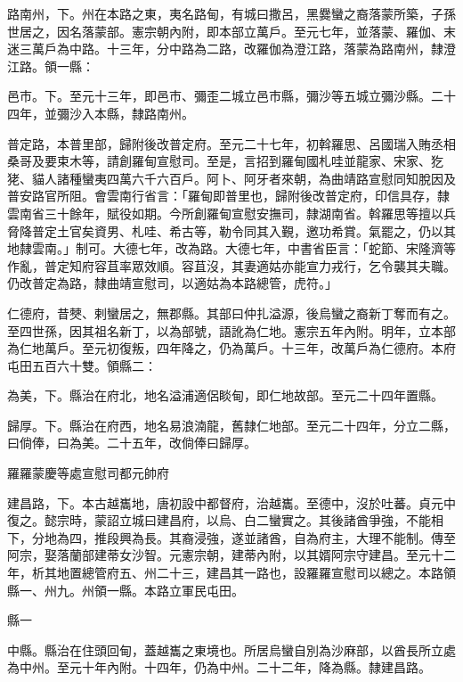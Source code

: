 \begin{pinyinscope}
 路南州，下。州在本路之東，夷名路甸，有城曰撒呂，黑爨蠻之裔落蒙所築，子孫世居之，因名落蒙部。憲宗朝內附，即本部立萬戶。至元七年，並落蒙、羅伽、末迷三萬戶為中路。十三年，分中路為二路，改羅伽為澄江路，落蒙為路南州，隸澄江路。領一縣：



 邑市。下。至元十三年，即邑市、彌歪二城立邑市縣，彌沙等五城立彌沙縣。二十四年，並彌沙入本縣，隸路南州。



 普定路，本普里部，歸附後改普定府。至元二十七年，初斡羅思、呂國瑞入賄丞相桑哥及要束木等，請創羅甸宣慰司。至是，言招到羅甸國札哇並龍家、宋家、犵狫、貓人諸種蠻夷四萬六千六百戶。阿卜、阿牙者來朝，為曲靖路宣慰同知脫因及普安路官所阻。會雲南行省言：「羅甸即普里也，歸附後改普定府，印信具存，隸雲南省三十餘年，賦役如期。今所創羅甸宣慰安撫司，隸湖南省。斡羅思等擅以兵脅降普定土官矣資男、札哇、希古等，勒令同其入覲，邀功希賞。氣罷之，仍以其地隸雲南。」制可。大德七年，改為路。大德七年，中書省臣言：「蛇節、宋隆濟等作亂，普定知府容苴率眾效順。容苴沒，其妻適姑亦能宣力戎行，乞令襲其夫職。仍改普定為路，隸曲靖宣慰司，以適姑為本路總管，虎符。」



 仁德府，昔僰、剌蠻居之，無郡縣。其部曰仲扎溢源，後烏蠻之裔新丁奪而有之。至四世孫，因其祖名新丁，以為部號，語訛為仁地。憲宗五年內附。明年，立本部為仁地萬戶。至元初復叛，四年降之，仍為萬戶。十三年，改萬戶為仁德府。本府屯田五百六十雙。領縣二：



 為美，下。縣治在府北，地名溢浦適侶睒甸，即仁地故部。至元二十四年置縣。



 歸厚。下。縣治在府西，地名易浪湳龍，舊隸仁地部。至元二十四年，分立二縣，曰倘俸，曰為美。二十五年，改倘俸曰歸厚。



 羅羅蒙慶等處宣慰司都元帥府



 建昌路，下。本古越巂地，唐初設中都督府，治越巂。至德中，沒於吐蕃。貞元中復之。懿宗時，蒙詔立城曰建昌府，以烏、白二蠻實之。其後諸酋爭強，不能相下，分地為四，推段興為長。其裔浸強，遂並諸酋，自為府主，大理不能制。傳至阿宗，娶落蘭部建蒂女沙智。元憲宗朝，建蒂內附，以其婿阿宗守建昌。至元十二年，析其地置總管府五、州二十三，建昌其一路也，設羅羅宣慰司以總之。本路領縣一、州九。州領一縣。本路立軍民屯田。



 縣一



 中縣。縣治在住頭回甸，蓋越巂之東境也。所居烏蠻自別為沙麻部，以酋長所立處為中州。至元十年內附。十四年，仍為中州。二十二年，降為縣。隸建昌路。




\end{pinyinscope}
